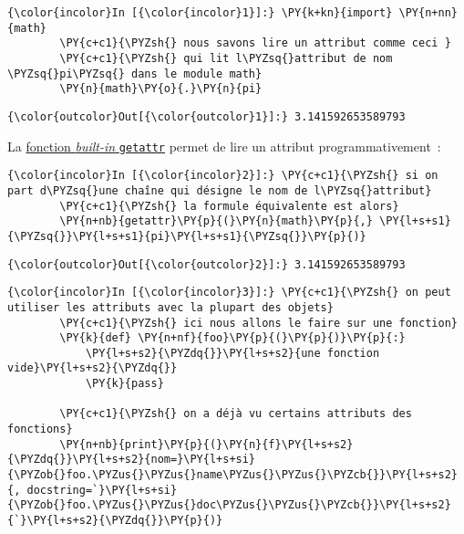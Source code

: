     \begin{Verbatim}[commandchars=\\\{\}]
{\color{incolor}In [{\color{incolor}1}]:} \PY{k+kn}{import} \PY{n+nn}{math}
        \PY{c+c1}{\PYZsh{} nous savons lire un attribut comme ceci }
        \PY{c+c1}{\PYZsh{} qui lit l\PYZsq{}attribut de nom \PYZsq{}pi\PYZsq{} dans le module math}
        \PY{n}{math}\PY{o}{.}\PY{n}{pi}
\end{Verbatim}


\begin{Verbatim}[commandchars=\\\{\}]
{\color{outcolor}Out[{\color{outcolor}1}]:} 3.141592653589793
\end{Verbatim}
            
    La
\href{https://docs.python.org/3/library/functions.html\#getattr}{fonction
\emph{built-in} \texttt{getattr}} permet de lire un attribut
programmativement~:

    \begin{Verbatim}[commandchars=\\\{\}]
{\color{incolor}In [{\color{incolor}2}]:} \PY{c+c1}{\PYZsh{} si on part d\PYZsq{}une chaîne qui désigne le nom de l\PYZsq{}attribut}
        \PY{c+c1}{\PYZsh{} la formule équivalente est alors}
        \PY{n+nb}{getattr}\PY{p}{(}\PY{n}{math}\PY{p}{,} \PY{l+s+s1}{\PYZsq{}}\PY{l+s+s1}{pi}\PY{l+s+s1}{\PYZsq{}}\PY{p}{)}
\end{Verbatim}


\begin{Verbatim}[commandchars=\\\{\}]
{\color{outcolor}Out[{\color{outcolor}2}]:} 3.141592653589793
\end{Verbatim}
            
    \begin{Verbatim}[commandchars=\\\{\}]
{\color{incolor}In [{\color{incolor}3}]:} \PY{c+c1}{\PYZsh{} on peut utiliser les attributs avec la plupart des objets}
        \PY{c+c1}{\PYZsh{} ici nous allons le faire sur une fonction}
        \PY{k}{def} \PY{n+nf}{foo}\PY{p}{(}\PY{p}{)}\PY{p}{:} 
            \PY{l+s+s2}{\PYZdq{}}\PY{l+s+s2}{une fonction vide}\PY{l+s+s2}{\PYZdq{}}
            \PY{k}{pass}
        
        \PY{c+c1}{\PYZsh{} on a déjà vu certains attributs des fonctions}
        \PY{n+nb}{print}\PY{p}{(}\PY{n}{f}\PY{l+s+s2}{\PYZdq{}}\PY{l+s+s2}{nom=}\PY{l+s+si}{\PYZob{}foo.\PYZus{}\PYZus{}name\PYZus{}\PYZus{}\PYZcb{}}\PY{l+s+s2}{, docstring=`}\PY{l+s+si}{\PYZob{}foo.\PYZus{}\PYZus{}doc\PYZus{}\PYZus{}\PYZcb{}}\PY{l+s+s2}{`}\PY{l+s+s2}{\PYZdq{}}\PY{p}{)}
\end{Verbatim}



